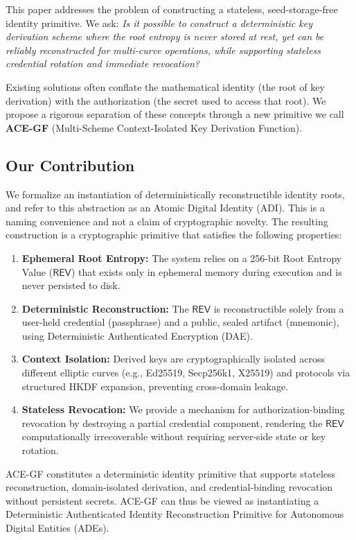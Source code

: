 \documentclass[12pt,a4paper]{article}
\begin{document}
  This paper addresses the problem of constructing a stateless, seed-storage-free identity primitive. We ask: \emph{Is it possible to construct a deterministic key derivation scheme where the root entropy is never stored at rest, yet can be reliably reconstructed for multi-curve operations, while supporting stateless credential rotation and immediate revocation?}

  Existing solutions often conflate the mathematical identity (the root of key derivation) with the authorization (the secret used to access that root). We propose a rigorous separation of these concepts through a new primitive we call \textbf{ACE-GF} (Multi-Scheme Context-Isolated Key Derivation Function).

  \subsection{Our Contribution}

  We formalize an instantiation of deterministically reconstructible identity roots, and refer to this abstraction as an Atomic Digital Identity (ADI). This is a naming convenience and not a claim of cryptographic novelty. The resulting construction is a cryptographic primitive that satisfies the following properties:

  \begin{enumerate}
   \item \textbf{Ephemeral Root Entropy:} The system relies on a 256-bit Root Entropy Value ($\mathsf{REV}$) that exists only in ephemeral memory during execution and is never persisted to disk.
   \item \textbf{Deterministic Reconstruction:} The $\mathsf{REV}$ is reconstructible solely from a user-held credential (passphrase) and a public, sealed artifact (mnemonic), using Deterministic Authenticated Encryption (DAE).
   \item \textbf{Context Isolation:} Derived keys are cryptographically isolated across different elliptic curves (e.g., Ed25519, Secp256k1, X25519) and protocols via structured HKDF expansion, preventing cross-domain leakage.
   \item \textbf{Stateless Revocation:} We provide a mechanism for authorization-binding revocation by destroying a partial credential component, rendering the $\mathsf{REV}$ computationally irrecoverable without requiring server-side state or key rotation.
  \end{enumerate}

  ACE-GF constitutes a deterministic identity primitive that supports stateless reconstruction, domain-isolated derivation, and credential-binding revocation without persistent secrets. ACE-GF can thus be viewed as instantiating a Deterministic Authenticated Identity Reconstruction Primitive for Autonomous Digital Entities (ADEs).
\end{document}
